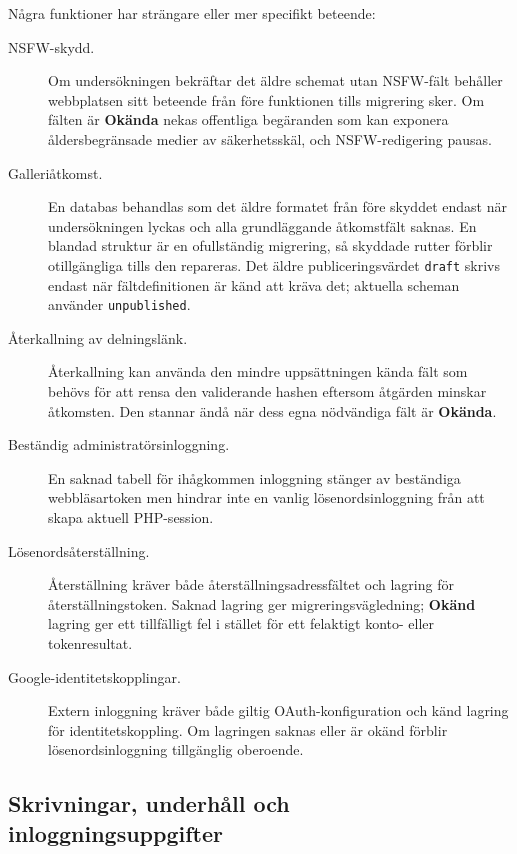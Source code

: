 \documentclass[11pt,a4paper]{article}
\newcommand{\ui}[1]{\textbf{#1}}
\newcommand{\codeword}[1]{\nolinkurl{#1}}
\begin{document}
Några funktioner har strängare eller mer specifikt beteende:

\begin{description}
  \item[NSFW-skydd.] Om undersökningen bekräftar det äldre schemat utan
  NSFW-fält behåller webbplatsen sitt beteende från före funktionen tills
  migrering sker. Om fälten är \ui{Okända} nekas offentliga begäranden som kan
  exponera åldersbegränsade medier av säkerhetsskäl, och NSFW-redigering pausas.
  \item[Galleriåtkomst.] En databas behandlas som det äldre formatet från före
  skyddet endast när undersökningen lyckas och alla grundläggande åtkomstfält
  saknas. En blandad struktur är en ofullständig migrering, så skyddade rutter
  förblir otillgängliga tills den repareras. Det äldre publiceringsvärdet
  \codeword{draft} skrivs endast när fältdefinitionen är känd att kräva det;
  aktuella scheman använder \codeword{unpublished}.
  \item[Återkallning av delningslänk.] Återkallning kan använda den mindre
  uppsättningen kända fält som behövs för att rensa den validerande hashen
  eftersom åtgärden minskar åtkomsten. Den stannar ändå när dess egna nödvändiga
  fält är \ui{Okända}.
  \item[Beständig administratörsinloggning.] En saknad tabell för ihågkommen
  inloggning stänger av beständiga webbläsartoken men hindrar inte en vanlig
  lösenordsinloggning från att skapa aktuell PHP-session.
  \item[Lösenordsåterställning.] Återställning kräver både
  återställningsadressfältet och lagring för återställningstoken. Saknad lagring
  ger migreringsvägledning; \ui{Okänd} lagring ger ett tillfälligt fel i stället
  för ett felaktigt konto- eller tokenresultat.
  \item[Google-identitetskopplingar.] Extern inloggning kräver både giltig
  OAuth-konfiguration och känd lagring för identitetskoppling. Om lagringen
  saknas eller är okänd förblir lösenordsinloggning tillgänglig oberoende.
\end{description}

\subsection{Skrivningar, underhåll och inloggningsuppgifter}
\end{document}
